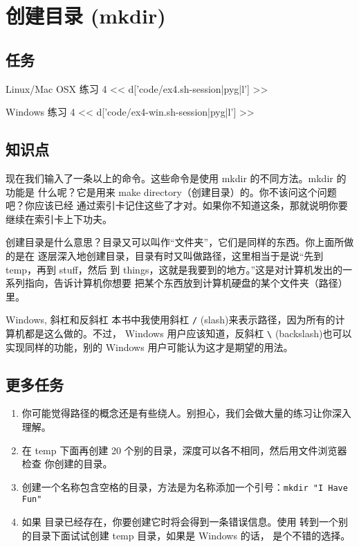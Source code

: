 \chapter{创建目录 (mkdir)}

\section{任务}

\begin{code}{Linux/Mac OSX 练习 4}
<< d['code/ex4.sh-session|pyg|l'] >>
\end{code}

\begin{code}{Windows 练习 4}
<< d['code/ex4-win.sh-session|pyg|l'] >>
\end{code}

\section{知识点}

现在我们输入了一条以上的命令。这些命令是使用 mkdir 的不同方法。mkdir 的功能是
什么呢？它是用来 make directory（创建目录）的。你不该问这个问题吧？你应该已经
通过索引卡记住这些了才对。如果你不知道这条，那就说明你要继续在索引卡上下功夫。

创建目录是什么意思？目录又可以叫作“文件夹”，它们是同样的东西。你上面所做的是在
逐层深入地创建目录，目录有时又叫做路径，这里相当于是说“先到 temp，再到 stuff，然后
到 things，这就是我要到的地方。”这是对计算机发出的一系列指向，告诉计算机你想要
把某个东西放到计算机硬盘的某个文件夹（路径）里。


\begin{aside}{Windows, 斜杠和反斜杠}
本书中我使用斜杠 \verb|/| (slash)来表示路径，因为所有的计算机都是这么做的。不过，
Windows 用户应该知道，反斜杠 \verb|\| (backslash)也可以实现同样的功能，别的
Windows 用户可能认为这才是期望的用法。
\end{aside}

\section{更多任务}

\begin{enumerate}
\item 你可能觉得路径的概念还是有些绕人。别担心，我们会做大量的练习让你深入理解。
\item 在 temp 下面再创建 20 个别的目录，深度可以各不相同，然后用文件浏览器检查
你创建的目录。
\item 创建一个名称包含空格的目录，方法是为名称添加一个引号：\verb|mkdir "I Have Fun"|
\item 如果  目录已经存在，你要创建它时将会得到一条错误信息。使用 
 转到一个别的目录下面试试创建 temp 目录，如果是 Windows 的话，
是个不错的选择。
\end{enumerate}

